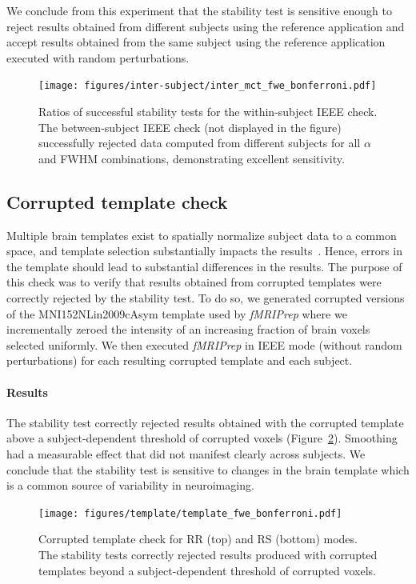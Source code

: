 \documentclass[lettersize,journal]{IEEEtran}
\newcommand{\fmriprep}{\emph{fMRIPrep}\xspace}
\begin{document}
We conclude from this experiment that the stability test is sensitive enough to
reject results obtained from different subjects using the reference application
and accept results obtained from the same subject using the reference
application executed with random perturbations.

\begin{figure}
  \centering
  \texttt{[image: figures/inter-subject/inter\_mct\_fwe\_bonferroni.pdf]}
  \caption{Ratios of successful stability tests for the within-subject IEEE check. The between-subject IEEE check (not displayed in the figure) successfully rejected data computed from different subjects for all $\alpha$ and FWHM combinations, demonstrating excellent sensitivity.
  }
  \label{fig:ieee-check}
\end{figure}

\subsection{Corrupted template check}
\label{subsec:template_check}

Multiple brain templates exist to spatially normalize subject data to a common
space, and template selection substantially impacts the
results~\cite{li2021moving}. Hence, errors in the template should lead to
substantial differences in the results. The purpose of this check was to verify
that results obtained from corrupted templates were correctly rejected by the
stability test. To do so, we generated corrupted versions of the
MNI152NLin2009cAsym template used by \fmriprep where we incrementally zeroed
the intensity of an increasing fraction of brain voxels selected uniformly. We
then executed \fmriprep in IEEE mode (without random perturbations) for each
resulting corrupted template and each subject.

\paragraph*{Results} The stability test correctly rejected results obtained with the corrupted template above a subject-dependent threshold of corrupted voxels (Figure~\ref{fig:template_bonferroni}). Smoothing had a measurable effect that did not manifest clearly across subjects. We conclude that the stability test is sensitive to changes in the brain template which is a common source of variability in neuroimaging.

\begin{figure}
  \centering
  \texttt{[image: figures/template/template\_fwe\_bonferroni.pdf]}
  \caption{Corrupted template check for RR (top) and RS (bottom) modes. The stability tests correctly rejected results produced with corrupted templates beyond a subject-dependent threshold of corrupted voxels.}
  \label{fig:template_bonferroni}
\end{figure}
\end{document}
